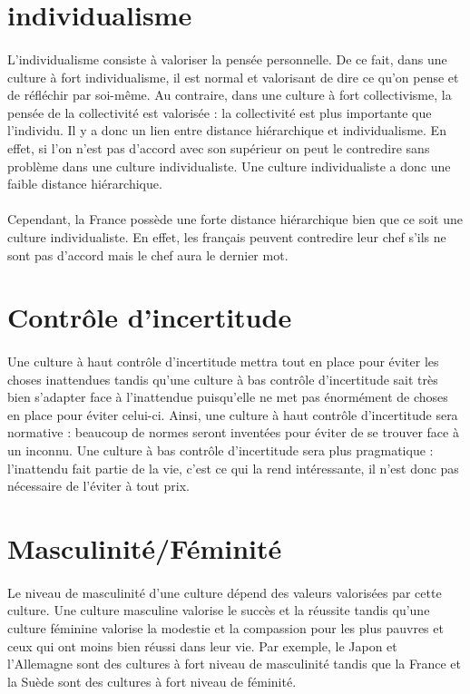 \section{individualisme}
\paragraph{}
L’individualisme consiste à valoriser la pensée personnelle. De ce fait, dans une culture à fort individualisme, il est normal et valorisant de dire ce qu’on pense et de réfléchir par soi-même. Au contraire, dans une culture à fort collectivisme, la pensée de la collectivité est valorisée : la collectivité est plus importante que l’individu. Il y a donc un lien entre distance hiérarchique et individualisme. En effet, si l’on n’est pas d’accord avec son supérieur on peut le contredire sans problème dans une culture individualiste. Une culture individualiste a donc une faible distance hiérarchique.
\paragraph{}
Cependant, la France possède une forte distance hiérarchique bien que ce soit une culture individualiste. En effet, les français peuvent contredire leur chef s’ils ne sont pas d’accord mais le chef aura le dernier mot. 

\section{Contrôle d'incertitude}
\paragraph{}
Une culture à haut contrôle d’incertitude mettra tout en place pour éviter les choses inattendues tandis qu’une culture à bas contrôle d’incertitude sait très bien s’adapter face à l’inattendue puisqu’elle ne met pas énormément de choses en place pour éviter celui-ci.  Ainsi, une culture à haut contrôle d’incertitude sera normative : beaucoup de normes seront inventées pour éviter de se trouver face à un inconnu. Une culture à bas contrôle d’incertitude sera plus pragmatique : l’inattendu fait partie de la vie, c’est ce qui la rend intéressante, il n’est donc pas nécessaire de l’éviter à tout prix. 

\section{Masculinité/Féminité}
\paragraph{}
Le niveau de masculinité d’une culture dépend des valeurs valorisées par cette culture. Une culture masculine valorise le succès et la réussite tandis qu’une culture féminine valorise la modestie et la compassion pour les plus pauvres et ceux qui ont moins bien réussi dans leur vie. Par exemple, le Japon et l’Allemagne sont des cultures à fort niveau de masculinité tandis que la France et la Suède sont des cultures à fort niveau de féminité. 

